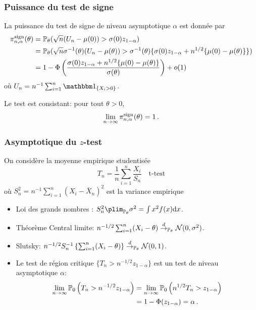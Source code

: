 \begin{frame}
\frametitle{Puissance du test de signe}
La puissance du test de signe de niveau asymptotique $\alpha$ est donnée par
\begin{align*}
\pi^{\mathrm{sign}}_{n,\alpha}(\theta)
&= \operatorname{{\mathbb P}}_\theta( \sqrt{n}(U_n - \mu(0)) > \sigma(0) z_{1-\alpha}) \\
&= \operatorname{{\mathbb P}}_\theta( \sqrt{n} \sigma^{-1}(\theta) (U_n - \mu(\theta)) > \sigma^{-1}(\theta) \{ \sigma(0) z_{1-\alpha} + n^{1/2} \{\mu(0)-\mu(\theta)\}\}) \\
&= 1 - \Phi\left( \frac{\sigma(0) z_{1-\alpha} + n^{1/2} \{ \mu(0) - \mu(\theta)\}}{\sigma(\theta)} \right) + o(1)
\end{align*}
où $U_n= n^{-1} \sum_{i=1}^n \indi{X_i > 0}$.

Le test est \alert{consistant}: pour tout $\theta > 0$,
\alert{
\[
\lim_{n \to \infty}  \pi^{\mathrm{sign}}_{n,\alpha}(\theta) = 1 \,.
\]
}
\end{frame}



\begin{frame}
\frametitle{Asymptotique du $z$-test}
On considère la moyenne empirique \alert{studentisée}
\begin{equation*}
T_n= \frac{1}{n} \sum_{i=1}^n \frac{X_i}{S_n} \quad \text{t-test}
\end{equation*}
où $S^2_n= n^{-1} \sum_{i=1}^n (X_i - \bar{X}_n)^2$ est la \alert{variance empirique}
\begin{itemize}
\item Loi des grands nombres : $S^2_n \plim_{\PP_{\theta}} \sigma^2 = \int x^2 f(x) \rmd x$.
\item Théorème Central limite: $n^{-1/2} \sum_{i=1}^n (X_i - \theta) \stackrel{d}{\rightarrow}_{\operatorname{{\mathbb P}}_\theta} \mathcal{N}(0,\sigma^2)$.
\item Slutsky: $n^{-1/2} S_n^{-1} \left\{ \sum_{i=1}^n (X_i-\theta)  \right\} \stackrel{d}{\rightarrow}_{\operatorname{{\mathbb P}}_\theta} \mathcal{N}(0,1)$.
\item Le test de région critique $\{ T_n > n^{-1/2} z_{1-\alpha} \}$ est un test de niveau asymptotique $\alpha$:
\begin{align*}
\lim_{n \to \infty} \operatorname{{\mathbb P}}_0 \left( T_n > n^{-1/2} z_{1-\alpha} \right) 
&= \lim_{n \to \infty} \operatorname{{\mathbb P}}_0 \left( n^{1/2} T_n > z_{1-\alpha} \right) \\
&= 1 - \Phi(z_{1-\alpha})= \alpha \,.
\end{align*}
\end{itemize}
\end{frame}


